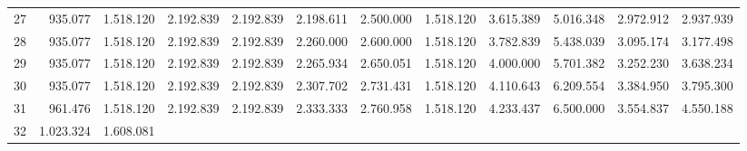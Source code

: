 \begin{tabular}{llllllllllll}
\multicolumn{1}{l}{\hspace{1em}27} &
  \multicolumn{1}{|r}{935.077} &
  \multicolumn{1}{r}{1.518.120} &
  \multicolumn{1}{r}{2.192.839} &
  \multicolumn{1}{r}{2.192.839} &
  \multicolumn{1}{r}{2.198.611} &
  \multicolumn{1}{r}{2.500.000} &
  \multicolumn{1}{r}{1.518.120} &
  \multicolumn{1}{r}{3.615.389} &
  \multicolumn{1}{r}{5.016.348} &
  \multicolumn{1}{r}{2.972.912} &
  \multicolumn{1}{r}{2.937.939} \\
\multicolumn{1}{l}{\hspace{1em}28} &
  \multicolumn{1}{|r}{935.077} &
  \multicolumn{1}{r}{1.518.120} &
  \multicolumn{1}{r}{2.192.839} &
  \multicolumn{1}{r}{2.192.839} &
  \multicolumn{1}{r}{2.260.000} &
  \multicolumn{1}{r}{2.600.000} &
  \multicolumn{1}{r}{1.518.120} &
  \multicolumn{1}{r}{3.782.839} &
  \multicolumn{1}{r}{5.438.039} &
  \multicolumn{1}{r}{3.095.174} &
  \multicolumn{1}{r}{3.177.498} \\
\multicolumn{1}{l}{\hspace{1em}29} &
  \multicolumn{1}{|r}{935.077} &
  \multicolumn{1}{r}{1.518.120} &
  \multicolumn{1}{r}{2.192.839} &
  \multicolumn{1}{r}{2.192.839} &
  \multicolumn{1}{r}{2.265.934} &
  \multicolumn{1}{r}{2.650.051} &
  \multicolumn{1}{r}{1.518.120} &
  \multicolumn{1}{r}{4.000.000} &
  \multicolumn{1}{r}{5.701.382} &
  \multicolumn{1}{r}{3.252.230} &
  \multicolumn{1}{r}{3.638.234} \\
\multicolumn{1}{l}{\hspace{1em}30} &
  \multicolumn{1}{|r}{935.077} &
  \multicolumn{1}{r}{1.518.120} &
  \multicolumn{1}{r}{2.192.839} &
  \multicolumn{1}{r}{2.192.839} &
  \multicolumn{1}{r}{2.307.702} &
  \multicolumn{1}{r}{2.731.431} &
  \multicolumn{1}{r}{1.518.120} &
  \multicolumn{1}{r}{4.110.643} &
  \multicolumn{1}{r}{6.209.554} &
  \multicolumn{1}{r}{3.384.950} &
  \multicolumn{1}{r}{3.795.300} \\
\multicolumn{1}{l}{\hspace{1em}31} &
  \multicolumn{1}{|r}{961.476} &
  \multicolumn{1}{r}{1.518.120} &
  \multicolumn{1}{r}{2.192.839} &
  \multicolumn{1}{r}{2.192.839} &
  \multicolumn{1}{r}{2.333.333} &
  \multicolumn{1}{r}{2.760.958} &
  \multicolumn{1}{r}{1.518.120} &
  \multicolumn{1}{r}{4.233.437} &
  \multicolumn{1}{r}{6.500.000} &
  \multicolumn{1}{r}{3.554.837} &
  \multicolumn{1}{r}{4.550.188} \\
\multicolumn{1}{l}{\hspace{1em}32} &
  \multicolumn{1}{|r}{1.023.324} &
  \multicolumn{1}{r}{1.608.081} &

\end{tabular}

